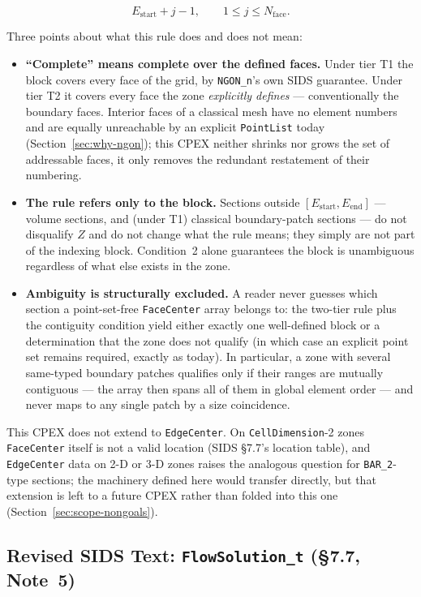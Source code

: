 \documentclass[11pt,letterpaper]{article}
\begin{document}
\[ E_{\mathrm{start}} + j - 1, \qquad 1 \le j \le N_{\mathrm{face}}. \]

Three points about what this rule does and does not mean:

\begin{itemize}[leftmargin=2em]
\item \textbf{``Complete'' means complete over the defined faces.} Under
  tier T1 the block covers every face of the grid, by \texttt{NGON\_n}'s
  own SIDS guarantee. Under tier T2 it covers every face the zone
  \emph{explicitly defines} --- conventionally the boundary faces.
  Interior faces of a classical mesh have no element numbers and are
  equally unreachable by an explicit \texttt{PointList} today
  (Section~\ref{sec:why-ngon}); this CPEX neither shrinks nor grows the
  set of addressable faces, it only removes the redundant restatement of
  their numbering.
\item \textbf{The rule refers only to the block.} Sections outside
  $[E_{\mathrm{start}}, E_{\mathrm{end}}]$ --- volume sections, and
  (under T1) classical boundary-patch sections --- do not disqualify $Z$
  and do not change what the rule means; they simply are not part of the
  indexing block. Condition~2 alone guarantees the block is unambiguous
  regardless of what else exists in the zone.
\item \textbf{Ambiguity is structurally excluded.} A reader never
  guesses which section a point-set-free \texttt{FaceCenter} array
  belongs to: the two-tier rule plus the contiguity condition yield
  either exactly one well-defined block or a determination that the
  zone does not qualify (in which case an explicit point set remains
  required, exactly as today). In particular, a zone with several
  same-typed boundary patches qualifies only if their ranges are
  mutually contiguous --- the array then spans all of them in global
  element order --- and never maps to any single patch by a size
  coincidence.
\end{itemize}

This CPEX does not extend to \texttt{EdgeCenter}. On
\texttt{CellDimension}-2 zones \texttt{FaceCenter} itself is not a valid
location (SIDS \S7.7's location table), and \texttt{EdgeCenter} data on
2-D or 3-D zones raises the analogous question for \texttt{BAR\_2}-type
sections; the machinery defined here would transfer directly, but that
extension is left to a future CPEX rather than folded into this one
(Section~\ref{sec:scope-nongoals}).

\subsection{Revised SIDS Text: \texttt{FlowSolution\_t} (\S7.7, Note~5)}
\label{sec:flowsolution-redline}
\end{document}
